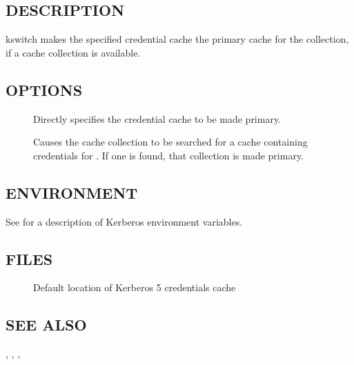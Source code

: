 \documentclass[letterpaper,10pt,english]{sphinxmanual}
\begin{document}
\subsection{DESCRIPTION}
\label{\detokenize{user/user_commands/kswitch:description}}
kswitch makes the specified credential cache the primary cache for the
collection, if a cache collection is available.


\subsection{OPTIONS}
\label{\detokenize{user/user_commands/kswitch:options}}\begin{description}
\item[{ }] \leavevmode
Directly specifies the credential cache to be made primary.

\item[{ }] \leavevmode
Causes the cache collection to be searched for a cache containing
credentials for .  If one is found, that collection is
made primary.

\end{description}


\subsection{ENVIRONMENT}
\label{\detokenize{user/user_commands/kswitch:environment}}
See {\hyperref[\detokenize{user/user_config/kerberos:kerberos-7}]{}} for a description of Kerberos environment
variables.


\subsection{FILES}
\label{\detokenize{user/user_commands/kswitch:files}}\begin{description}
\item[{}] \leavevmode
Default location of Kerberos 5 credentials cache

\end{description}


\subsection{SEE ALSO}
\label{\detokenize{user/user_commands/kswitch:see-also}}
{\hyperref[\detokenize{user/user_commands/kinit:kinit-1}]{}}, {\hyperref[\detokenize{user/user_commands/kdestroy:kdestroy-1}]{}}, {\hyperref[\detokenize{user/user_commands/klist:klist-1}]{}},
{\hyperref[\detokenize{user/user_config/kerberos:kerberos-7}]{}}
\end{document}

